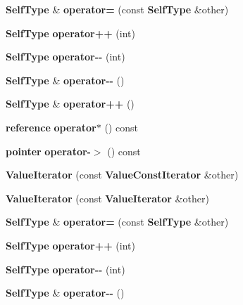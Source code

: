\begin{DoxyCompactItemize}
\item 
{\bf Self\+Type} \& {\bfseries operator=} (const {\bf Self\+Type} \&other)\label{class_json_1_1_value_iterator_a263912ab48a278202312cfddf636bc71}

\item 
{\bf Self\+Type} {\bfseries operator++} (int)\label{class_json_1_1_value_iterator_abcf4ddd994a010742cd4a436d65acd08}

\item 
{\bf Self\+Type} {\bfseries operator-\/-\/} (int)\label{class_json_1_1_value_iterator_a06d6a29d96caf6af324a53973159e12b}

\item 
{\bf Self\+Type} \& {\bfseries operator-\/-\/} ()\label{class_json_1_1_value_iterator_a811302a868518a0995a9def955df5720}

\item 
{\bf Self\+Type} \& {\bfseries operator++} ()\label{class_json_1_1_value_iterator_a92146c46f8249e2b2d12869e70cd4cee}

\item 
{\bf reference} {\bfseries operator$\ast$} () const \label{class_json_1_1_value_iterator_aaa5be3457eedf0526a03b8a3b4c7c0a0}

\item 
{\bf pointer} {\bfseries operator-\/$>$} () const \label{class_json_1_1_value_iterator_ad9882e4ce815cef6a504afa113544bfb}

\item 
{\bfseries Value\+Iterator} (const {\bf Value\+Const\+Iterator} \&other)\label{class_json_1_1_value_iterator_aa85aa208670891670392259efa0143bb}

\item 
{\bfseries Value\+Iterator} (const {\bf Value\+Iterator} \&other)\label{class_json_1_1_value_iterator_a7d5e58a9a4a553968acdf3064b39d21c}

\item 
{\bf Self\+Type} \& {\bfseries operator=} (const {\bf Self\+Type} \&other)\label{class_json_1_1_value_iterator_a263912ab48a278202312cfddf636bc71}

\item 
{\bf Self\+Type} {\bfseries operator++} (int)\label{class_json_1_1_value_iterator_abcf4ddd994a010742cd4a436d65acd08}

\item 
{\bf Self\+Type} {\bfseries operator-\/-\/} (int)\label{class_json_1_1_value_iterator_a06d6a29d96caf6af324a53973159e12b}

\item 
{\bf Self\+Type} \& {\bfseries operator-\/-\/} ()\label{class_json_1_1_value_iterator_a811302a868518a0995a9def955df5720}


\end{DoxyCompactItemize}
